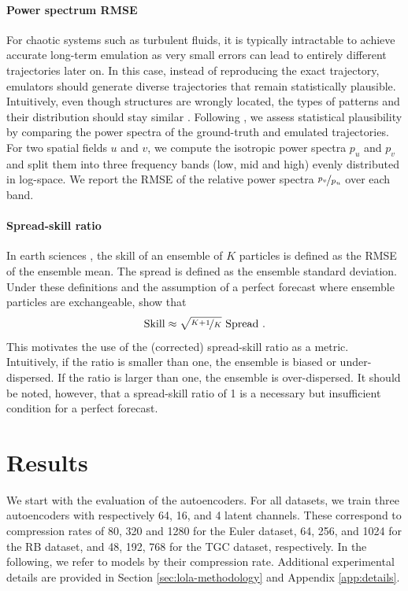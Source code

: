 \paragraph{Power spectrum RMSE} For chaotic systems such as turbulent fluids, it is typically intractable to achieve accurate long-term emulation as very small errors can lead to entirely different trajectories later on. In this case, instead of reproducing the exact trajectory, emulators should generate diverse trajectories that remain statistically plausible. Intuitively, even though structures are wrongly located, the types of patterns and their distribution should stay similar \cite{dryden1943review}. Following \textcite{ohana2024well}, we assess statistical plausibility by comparing the power spectra of the ground-truth and emulated trajectories. For two spatial fields $u$ and $v$, we compute the isotropic power spectra $p_u$ and $p_v$ and split them into three frequency bands (low, mid and high) evenly distributed in log-space. We report the RMSE of the relative power spectra $\nicefrac{p_v}{p_u}$ over each band.

\paragraph{Spread-skill ratio} In earth sciences \cite{fortin2014why, price2025probabilistic}, the skill of an ensemble of $K$ particles is defined as the RMSE of the ensemble mean. The spread is defined as the ensemble standard deviation. Under these definitions and the assumption of a perfect forecast where ensemble particles are exchangeable, \textcite{fortin2014why} show that
\begin{equation}
    \operatorname{Skill} \approx \sqrt{\nicefrac{K+1}{K}} \, \operatorname{Spread} \, .
\end{equation}
This motivates the use of the (corrected) spread-skill ratio as a metric. Intuitively, if the ratio is smaller than one, the ensemble is biased or under-dispersed. If the ratio is larger than one, the ensemble is over-dispersed. It should be noted, however, that a spread-skill ratio of 1 is a necessary but insufficient condition for a perfect forecast.

\section{Results} \label{sec:lola-results}

We start with the evaluation of the autoencoders. For all datasets, we train three autoencoders with respectively 64, 16, and 4 latent channels. These correspond to compression rates of 80, 320 and 1280 for the Euler dataset, 64, 256, and 1024 for the RB dataset, and 48, 192, 768 for the TGC dataset, respectively. In the following, we refer to models by their compression rate. Additional experimental details are provided in Section \ref{sec:lola-methodology} and Appendix \ref{app:details}.

